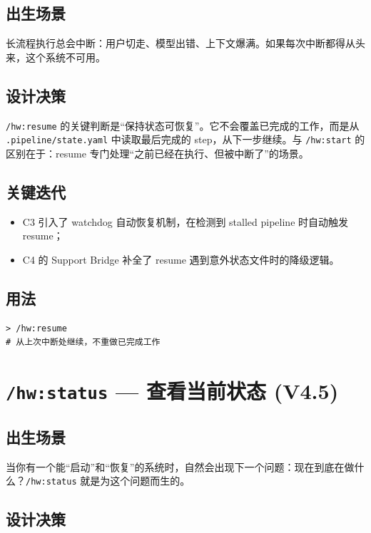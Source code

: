 \documentclass[
  outputdir=build,
  chapterstyle=cn,
  colorscheme=Simple,
  fontset=tech,
  code=false
]{Hypo-Note}
\begin{document}
\subsection{出生场景}

长流程执行总会中断：用户切走、模型出错、上下文爆满。如果每次中断都得从头来，这个系统不可用。

\subsection{设计决策}

\texttt{/hw:resume} 的关键判断是“保持状态可恢复”。它不会覆盖已完成的工作，而是从 \texttt{.pipeline/state.yaml} 中读取最后完成的 step，从下一步继续。与 \texttt{/hw:start} 的区别在于：resume 专门处理“之前已经在执行、但被中断了”的场景。

\subsection{关键迭代}

\begin{itemize}[leftmargin=2em]
  \item C3 引入了 watchdog 自动恢复机制，在检测到 stalled pipeline 时自动触发 resume；
  \item C4 的 Support Bridge 补全了 resume 遇到意外状态文件时的降级逻辑。
\end{itemize}

\subsection{用法}

\begin{lstlisting}[caption=恢复中断的 pipeline]
> /hw:resume
# 从上次中断处继续，不重做已完成工作
\end{lstlisting}

\section{\texttt{/hw:status} — 查看当前状态 (V4.5)}

\subsection{出生场景}

当你有一个能“启动”和“恢复”的系统时，自然会出现下一个问题：现在到底在做什么？\texttt{/hw:status} 就是为这个问题而生的。

\subsection{设计决策}
\end{document}
